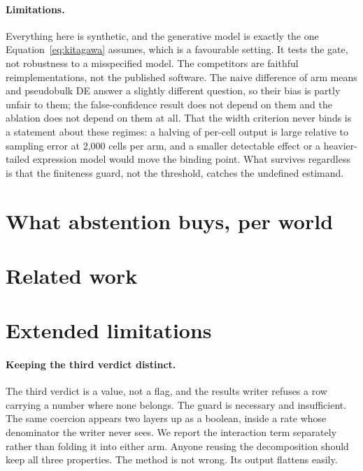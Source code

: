 \paragraph{Limitations.} Everything here is synthetic, and the generative model
is exactly the one Equation~\ref{eq:kitagawa} assumes, which is a favourable
setting. It tests the gate, not robustness to a misspecified model. The
competitors are faithful reimplementations, not the published software. The
naive difference of arm means and pseudobulk DE answer a slightly different
question, so their bias is partly unfair to them; the false-confidence result
does not depend on them and the ablation does not depend on them at all. That
the width criterion never binds is a statement about these regimes: a halving of
per-cell output is large relative to sampling error at 2{,}000 cells per arm, and
a smaller detectable effect or a heavier-tailed expression model would move the
binding point. What survives regardless is that the finiteness guard, not the
threshold, catches the undefined estimand.

\section{What abstention buys, per world}


\section{Related work}
\label{app:relatedwork}


\section{Extended limitations}
\label{app:limitations}

\paragraph{Keeping the third verdict distinct.} The third verdict is a value, not
a flag, and the results writer refuses a row carrying a number where none
belongs. The guard is necessary and insufficient.
The same coercion appears two layers up as a boolean, inside a rate whose
denominator the writer never sees. We report the
interaction term separately rather than folding it into either arm. Anyone
reusing the decomposition should keep all three properties. The method is not
wrong. Its output flattens easily.

